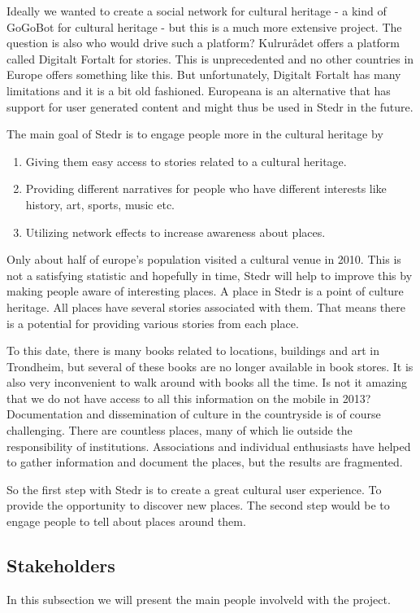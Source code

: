 Ideally we wanted to create a social network for cultural heritage - a kind of GoGoBot for cultural heritage - but this is a much more extensive project. The question is also who would drive such a platform? Kulrurådet offers a platform called Digitalt Fortalt for stories. This is unprecedented and no other countries in Europe offers something like this. But unfortunately, Digitalt Fortalt has many limitations and it is a bit old fashioned. Europeana is an alternative that has support for user generated content and might thus be used in Stedr in the future.

The main goal of Stedr is to engage people more in the cultural heritage by
\begin{enumerate}
\item Giving them easy access to stories related to a cultural heritage. \item Providing different narratives for people who have different interests like history, art, sports, music etc. \item Utilizing network effects to increase awareness about places.
\end{enumerate}

Only about half of europe's population visited a cultural venue in 2010. This is not a satisfying statistic and hopefully in time, Stedr will help to improve this by making people aware of interesting places. A place in Stedr is a point of culture heritage. All places have several stories associated with them. That means there is a potential for providing various stories from each place.

To this date, there is many books related to locations, buildings and art in Trondheim, but several of these books are no longer available in book stores. It is also very inconvenient to walk around with books all the time. Is not it amazing that we do not have access to all this information on the mobile in 2013? Documentation and dissemination of culture in the countryside is of course challenging. There are countless places, many of which lie outside the responsibility of institutions. Associations and individual enthusiasts have helped to gather information and document the places, but the results are fragmented.

So the first step with Stedr is to create a great cultural user experience. To provide the opportunity to discover new places. The second step would be to engage people to tell about places around them.


\subsection{Stakeholders}
In this subsection we will present the main people involveld with the project. 


